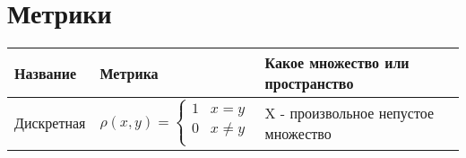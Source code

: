 

\section{Метрики}
\begin{tabular}{|m{2.5cm}|m{6cm}|m{7cm}|}
    \hline
    Название              & Метрика                                                                  & Какое множество или пространство                                                                                  \\
    \hline

    Дискретная            & $
        \rho (x,y) =
    \begin{cases}
            1 & x=y      \\
            0 & x \neq y \\
        \end{cases}$       & X - произвольное непустое множество

    \\
    \hline


\end{tabular}
